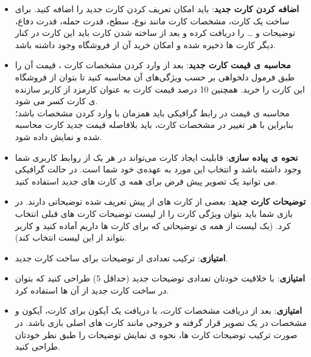 \documentclass[]{article}
\begin{document}
\begin{itemize}
    \item \textbf{اضافه کردن کارت جدید}: باید امکان تعریف کردن کارت جدید را اضافه کنید. برای ساخت یک کارت، مشخصات کارت مانند نوع، سطح، قدرت حمله، قدرت دفاع، توضیحات و … را دریافت کرده و بعد از ساخته شدن کارت باید این کارت در کنار دیگر کارت ها ذخیره شده و امکان خرید آن از فروشگاه وجود داشته باشد.
    \item \textbf{محاسبه ی قیمت کارت جدید}: بعد از وارد کردن مشخصات کارت ، قیمت آن را طبق فرمول دلخواهی بر حسب ویژگی‌های آن محاسبه کنید تا بتوان از فروشگاه این کارت را خرید. همچنین 10 درصد قیمت کارت به عنوان کارمزد از کاربر سازنده ی کارت کسر می شود. \\
    محاسبه ی قیمت در رابط گرافیکی باید همزمان با وارد کردن مشخصات باشد؛ بنابراین با هر تغییر در مشخصات کارت، باید بلافاصله قیمت جدید کارت محاسبه شده و نمایش داده شود.
    \item \textbf{نحوه ی پیاده سازی}: قابلیت ایجاد کارت می‌تواند در هر یک از روابط کاربری شما وجود داشته باشد و انتخاب این مورد به عهده‌ی خود شما است. در حالت گرافیکی می توانید یک تصویر پیش فرض برای همه ی کارت های جدید استفاده کنید. 
    \item \textbf{توضیحات کارت جدید}: بعضی از کارت های از پیش تعریف شده توضیحاتی دارند. در بازی شما باید بتوان ویژگی کارت را از لیست توضیحات کارت های قبلی انتخاب کرد. (یک لیست از همه ی توضیحاتی که برای کارت ها داریم آماده کنید و کاربر بتواند از این لیست انتخاب کند).
    \item \textbf{امتیازی}: ترکیب تعدادی از توضیحات برای ساخت کارت جدید.
    \item \textbf{امتیازی}: با خلاقیت خودتان تعدادی توضیحات جدید (حداقل 5) طراحی کنید که بتوان در ساخت کارت جدید از آن ها استفاده کرد.
    \item \textbf{امتیازی}: بعد از دریافت مشخصات کارت، با دریافت یک آیکون برای کارت، آیکون و مشخصات در یک تصویر قرار گرفته و خروجی مانند کارت های اصلی بازی باشد. در صورت ترکیب توضیحات کارت ها، نحوه ی نمایش توضیحات را طبق نظر خودتان طراحی کنید.
\end{itemize}
\end{document}
